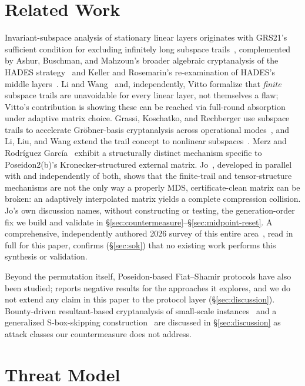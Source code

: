 \documentclass[conference]{IEEEtran}
\theoremstyle{definition}
\theoremstyle{plain}
\begin{document}
\section{Related Work}
\label{sec:related}
Invariant-subspace analysis of stationary linear layers originates with
GRS21's sufficient condition for excluding infinitely long subspace
trails~\cite{weaklayers2020}, complemented by Ashur, Buschman, and
Mahzoun's broader algebraic cryptanalysis of the HADES
strategy~\cite{algebraiccrypt2023} and Keller and Rosemarin's
re-examination of HADES's middle layers~\cite{mindthemiddle2021}.
Li and Wang~\cite{cryptoeprint:2026/967} and, independently, Vitto
\cite{slipway2026} formalize that \emph{finite} subspace trails are
unavoidable for every linear layer, not themselves a flaw; Vitto's
contribution is showing these can be reached via full-round absorption
under adaptive matrix choice. Grassi, Koschatko, and Rechberger use
subspace trails to accelerate Gr\"obner-basis cryptanalysis across
operational modes~\cite{poseidonneptune2025}, and Li, Liu, and Wang
extend the trail concept to nonlinear subspaces~\cite{nonlinear2026}.
Merz and Rodr\'iguez Garc\'ia~\cite{cryptoeprint:2026/306} exhibit a
structurally distinct mechanism specific to Poseidon2(b)'s
Kronecker-structured external matrix. Jo~\cite{jo2026}, developed in
parallel with and independently of both, shows that the finite-trail and
tensor-structure mechanisms are not the only way a properly MDS,
certificate-clean matrix can be broken: an adaptively interpolated
matrix yields a complete compression collision. Jo's own discussion
names, without constructing or testing, the generation-order fix we
build and validate in \S\ref{sec:countermeasure}--\S\ref{sec:midpoint-reset}.
A comprehensive, independently authored 2026 survey of this entire
area~\cite{sok2026}, read in full for this paper, confirms (\S\ref{sec:sok})
that no existing work performs this synthesis or validation.

Beyond the permutation itself, Poseidon-based Fiat--Shamir protocols
have also been studied; \cite{cryptoeprint:2026/409} reports negative
results for the approaches it explores, and we do not extend any claim
in this paper to the protocol layer (\S\ref{sec:discussion}).
Bounty-driven resultant-based cryptanalysis of small-scale
instances~\cite{cryptoeprint:2026/150} and a generalized S-box-skipping
construction~\cite{sboxskip2026} are discussed in \S\ref{sec:discussion}
as attack classes our countermeasure does not address.

\section{Threat Model}
\label{sec:model}
\end{document}
